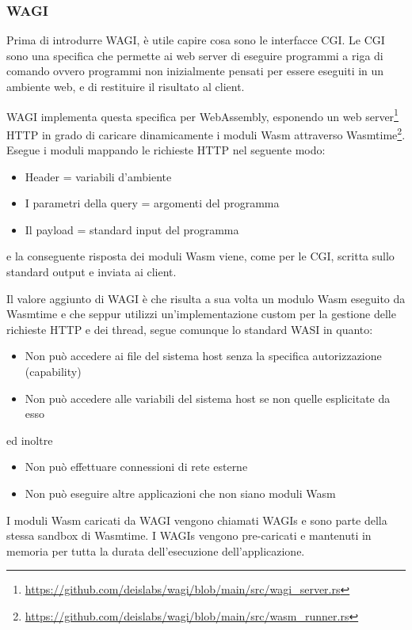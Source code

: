 \subsubsection{WAGI}
Prima di introdurre WAGI, è utile capire cosa sono le interfacce CGI. Le CGI sono una specifica che permette ai web
server di eseguire programmi a riga di comando ovvero programmi non inizialmente pensati per essere eseguiti in un
ambiente web, e di restituire il risultato al client.

WAGI implementa questa specifica per WebAssembly, esponendo un web
server\footnote{\url{https://github.com/deislabs/wagi/blob/main/src/wagi_server.rs}} HTTP in grado di caricare
dinamicamente i moduli Wasm attraverso
Wasmtime\footnote{\url{https://github.com/deislabs/wagi/blob/main/src/wasm_runner.rs}}. Esegue i moduli mappando le
richieste HTTP nel seguente modo:
\begin{itemize}
    \item Header = variabili d'ambiente
    \item I parametri della query = argomenti del programma
    \item Il payload = standard input del programma
\end{itemize}

e la conseguente risposta dei moduli Wasm viene, come per le CGI, scritta sullo standard output e inviata ai client.

Il valore aggiunto di WAGI è che risulta a sua volta un modulo Wasm eseguito da Wasmtime e che seppur utilizzi
un'implementazione custom per la gestione delle richieste HTTP e dei thread, segue comunque lo standard WASI in quanto:
\begin{itemize}
    \item Non può accedere ai file del sistema host senza la specifica autorizzazione (capability)
    \item Non può accedere alle variabili del sistema host se non quelle esplicitate da esso
\end{itemize}
ed inoltre
\begin{itemize}
    \item Non può effettuare connessioni di rete esterne
    \item Non può eseguire altre applicazioni che non siano moduli Wasm
\end{itemize}

I moduli Wasm caricati da WAGI vengono chiamati WAGIs e sono parte della stessa sandbox di Wasmtime. I WAGIs vengono
pre-caricati e mantenuti in memoria per tutta la durata dell'esecuzione dell'applicazione.

